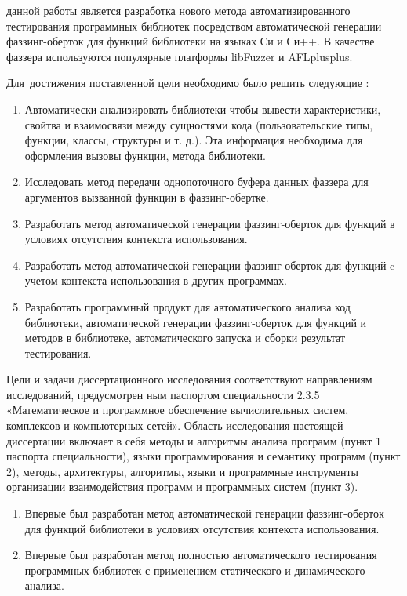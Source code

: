{\aim} данной работы является разработка нового метода автоматизированного тестирования программных библиотек посредством автоматической генерации фаззинг-оберток для функций библиотеки на языках Си и Си++. В качестве  фаззера используются популярные платформы libFuzzer и AFLplusplus.

Для~достижения поставленной цели необходимо было решить следующие {\tasks}:
\begin{enumerate}[beginpenalty=10000] %
  \item Автоматически анализировать библиотеки чтобы вывести характеристики, свойтва и взаимосвязи между сущностями кода (пользовательские типы, функции, классы, структуры и т. д.). Эта информация необходима для оформления вызовы функции, метода библиотеки.
  \item Исследовать метод передачи однопоточного буфера данных фаззера для аргументов вызванной функции в фаззинг-обертке.
  \item Разработать метод автоматической генерации фаззинг-оберток для функций в условиях отсутствия контекста использования.
  \item Разработать метод автоматической генерации фаззинг-оберток для функций c учетом контекста использования в других программах.
  \item Разработать программный продукт для автоматического анализа код библиотеки, автоматической генерации фаззинг-оберток для функций и методов в библиотеке, автоматического запуска и сборки результат тестирования.
\end{enumerate}

{\compliance} Цели и задачи диссертационного исследования соответствуют направлениям исследований, предусмотрен­ ным паспортом специальности 2.3.5 «Математическое и программное обеспечение вычислительных систем, комплексов и компьютерных сетей». Область исследования настоящей диссертации включает в себя методы и алгоритмы анализа программ (пункт 1 паспорта специальности), языки программирования  и семантику программ (пункт 2), методы, архитектуры, алгоритмы, языки и программные инструменты организации взаимодействия программ и программных систем (пункт 3).

{\novelty}
\begin{enumerate}[beginpenalty=10000] %
  \item Впервые был разработан метод автоматической генерации фаззинг-оберток для функций библиотеки в условиях отсутствия контекста использования.
  \item Впервые был разработан метод полностью автоматического тестирования программных библиотек с применением статического и динамического анализа.
\end{enumerate}


